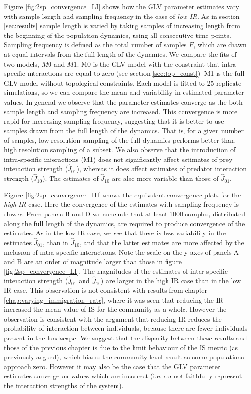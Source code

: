 Figure \ref{fig:2sp_convergence_LI} shows how the GLV parameter estimates vary with sample length and sampling frequency in the case of \emph{low IR}. As in section \ref{sec:results} sample length is varied by taking samples of increasing length from the beginning of the population dynamics, using all consecutive time points. Sampling frequency is defined as the total number of samples  $F$, which are drawn at equal intervals from the full length of the dynamics. We compare the fits of two models, $M0$ and $M1$. M0 is the GLV model with the constraint that intra-specific interactions are equal to zero (see section \ref{sec:top_const}). M1 is the full GLV model without topological constraints. Each  model is fitted to 25 replicate simulations, so we can compare the mean and variability in estimated parameter values. In general we observe that the parameter estimates converge as the both sample length and sampling frequency are increased. This convergence is more rapid for increasing sampling frequency, suggesting that it is better to use samples drawn from the full length of the dynamics. That is, for a given number of samples, low resolution sampling of the full dynamics performs better than high resolution sampling of a subset. We also observe that the introduction of intra-specific interactions (M1) does not significantly affect estimates of prey interaction strength ($\hat{J}_{01}$), whereas it does affect estimates of predator interaction strength ($\hat{J}_{10}$). The estimates of $\hat{J}_{10}$ are also more variable than those of $\hat{J}_{01}$.

Figure \ref{fig:2sp_convergence_HI} shows the equivalent convergence plots for the \emph{high IR} case. Here the convergence of the estimates with sampling frequency is slower. From panels B and D we conclude that at least 1000 samples, distributed along the full length of the dynamics, are required to produce convergence of the estimates. As in the low IR case, we see that there is less variability in the estimates $\hat{J}_{01}$, than in $\hat{J}_{10}$, and that the latter estimates are more affected by the inclusion of intra-specific interactions. Note the scale on the y-axes of panels A and B are an order of magnitude larger than those in figure \ref{fig:2sp_convergence_LI}. The magnitudes of the estimates of inter-specific interaction strength ($\hat{J}_{01}$ and $\hat{J}_{10}$) are larger in the high IR case than in the low IR case. This observation is not consistent with results from chapter \ref{chap:varying_immigration_rate}, where it was seen that reducing the IR increased the mean value of IS for the community as a whole. However the observation is consistent with the argument that reducing IR reduces the probability of interaction between individuals, because there are fewer individuals present in the landscape. We suggest that the disparity between these results and those of the previous chapter is due to the limit behaviour of the IS metric (as previously argued), which biases the community level result as some populations approach zero. However it may also be the case that the GLV parameter estimates converge on values which are incorrect (i.e. do not faithfully represent the interaction strengths of the system). 

